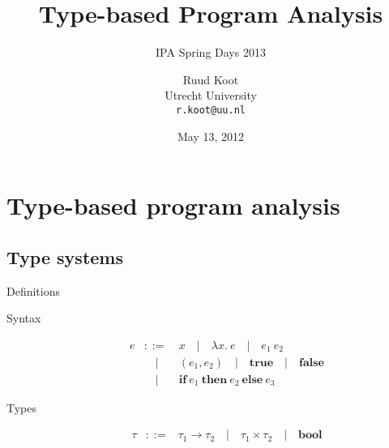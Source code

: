 \documentclass{beamer}
\newcommand{\Pipe}{\quad | \quad}
\newcommand{\Pair}[2]{\left(#1, #2\right)}
\newcommand{\BTrue}{\mathbf{true}}
\newcommand{\BFalse}{\mathbf{false}}
\newcommand{\ITE}[3]{\mathbf{if}\ #1\ \mathbf{then}\ #2\ \mathbf{else}\ #3}
\newcommand{\TBool}{\mathbf{bool}}
\newcommand{\TFun}[2]{#1 \to #2}
\newcommand{\TPair}[2]{#1 \times #2}
\begin{document}
\title{Type-based Program Analysis}
\subtitle{IPA Spring Days 2013}
\author{Ruud Koot\\Utrecht University\\\texttt{r.koot@uu.nl}}
\date{May 13, 2012}
\maketitle

\section{Type-based program analysis}

\subsection{Type systems}

\begin{frame}{Definitions}
	\begin{description}
		\item[Syntax]
			\begin{eqnarray*}
				e &::=& x \Pipe \lambda x.\ e \Pipe e_1\ e_2 \\
				  &\Pipe& \Pair{e_1}{e_2} \Pipe \BTrue \Pipe \BFalse \\
				  &\Pipe& \ITE{e_1}{e_2}{e_3}
			\end{eqnarray*}
		\item[Types]
			\begin{eqnarray*}
				\tau &::=& \TFun{\tau_1}{\tau_2} \Pipe \TPair{\tau_1}{\tau_2} \Pipe \TBool
			\end{eqnarray*}
	\end{description}
\end{frame}
\end{document}
